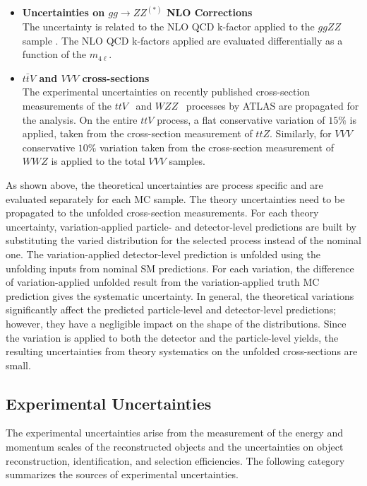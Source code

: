\begin{itemize}
\item{\textbf{Uncertainties on $gg\rightarrow ZZ^{(\ast)}$ NLO Corrections}\\
The uncertainty is related to the NLO QCD k-factor applied to the $ggZZ$ sample \cite{ggZZNLOUnc}. The NLO QCD k-factors applied are evaluated differentially as a function of the $m_{4\ell}$. 
}

\item{\textbf{$t\bar{t}V$ and $VVV$ cross-sections}\\
The experimental uncertainties on recently published cross-section measurements of the $ttV$~\cite{ATLAS_ttV} and $WZZ$~\cite{ATLAS_VVV} processes by ATLAS are propagated for the analysis. On the entire $ttV$ process, a flat conservative variation of $15\%$ is applied, taken from the cross-section measurement of $ttZ$. Similarly, for $VVV$ conservative $10\%$ variation taken from the cross-section measurement of $WWZ$ is applied to the total $VVV$ samples.
}

\end{itemize}

As shown above, the theoretical uncertainties are process specific and are evaluated separately for each MC sample. The theory uncertainties need to be propagated to the unfolded cross-section measurements. For each theory uncertainty, variation-applied particle- and detector-level predictions are built by substituting the varied distribution for the selected process instead of the nominal one. The variation-applied detector-level prediction is unfolded using the unfolding inputs from nominal SM predictions. For each variation, the difference of variation-applied unfolded result from the variation-applied truth MC prediction gives the systematic uncertainty. In general, the theoretical variations significantly affect the predicted particle-level and detector-level predictions; however, they have a negligible impact on the shape of the distributions. Since the variation is applied to both the detector and the particle-level yields, the resulting uncertainties from theory systematics on the unfolded cross-sections are small.

\subsection{Experimental Uncertainties}
\label{subsec:ExpUnc}
The experimental uncertainties arise from the measurement of the energy and momentum scales of the reconstructed objects and the uncertainties on object reconstruction, identification, and selection efficiencies. The following category summarizes the sources of experimental uncertainties.

